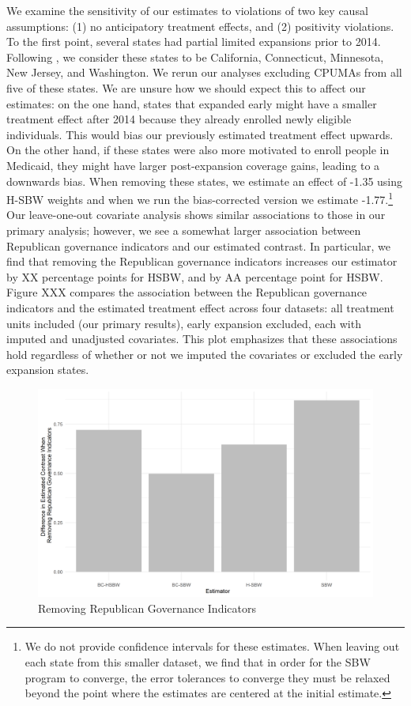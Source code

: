 \documentclass[12pt]{article}
\begin{document}
We examine the sensitivity of our estimates to violations of two key causal assumptions: (1) no anticipatory treatment effects, and (2) positivity violations. To the first point, several states had partial limited expansions prior to 2014. Following \cite{frean2017premium}, we consider these states to be California, Connecticut, Minnesota, New Jersey, and Washington. We rerun our analyses excluding CPUMAs from all five of these states. We are unsure how we should expect this to affect our estimates: on the one hand, states that expanded early might have a smaller treatment effect after 2014 because they already enrolled newly eligible individuals. This would bias our previously estimated treatment effect upwards. On the other hand, if these states were also more motivated to enroll people in Medicaid, they might have larger post-expansion coverage gains, leading to a downwards bias. When removing these states, we estimate an effect of -1.35 using H-SBW weights and when we run the bias-corrected version we estimate -1.77.\footnote{We do not provide confidence intervals for these estimates. When leaving out each state from this smaller dataset, we find that in order for the SBW program to converge, the error tolerances to converge they must be relaxed beyond the point where the estimates are centered at the initial estimate.} Our leave-one-out covariate analysis shows similar associations to those in our primary analysis; however, we see a somewhat larger association between Republican governance indicators and our estimated contrast. In particular, we find that removing the Republican governance indicators increases our estimator by XX percentage points for HSBW, and by AA percentage point for HSBW. Figure XXX compares the association between the Republican governance indicators and the estimated treatment effect across four datasets: all treatment units included (our primary results), early expansion excluded, each with imputed and unadjusted covariates. This plot emphasizes that these associations hold regardless of whether or not we imputed the covariates or excluded the early expansion states.

\begin{figure}[]
\begin{center}
    \includegraphics[scale=0.6]{01_Plots/repub-diff-c1.png}
    \caption{Removing Republican Governance Indicators}
    \label{repub}
\end{center}
\end{figure}
\end{document}
